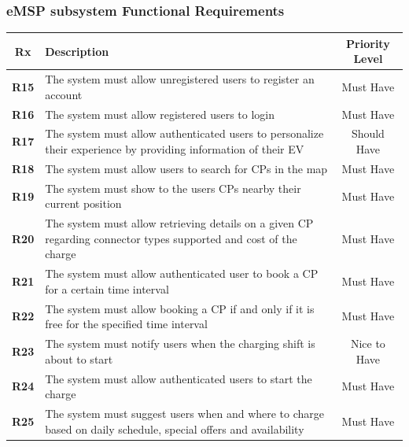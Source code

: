 \subsubsection{eMSP subsystem Functional Requirements}
\begin{table}[H]
    \begin{tabularx}{\textwidth}{cXc}
        \textbf{Rx}  & Description                                                                                                       & Priority Level \\
        \toprule
        \textbf{R15} & The system must allow unregistered users to register an account                                                   & Must Have      \\
        \textbf{R16} & The system must allow registered users to login                                                                   & Must Have      \\
        \textbf{R17} & The system must allow authenticated users to personalize their experience by providing information of their EV    & Should Have    \\
        \textbf{R18} & The system must allow users to search for CPs in the map                                                          & Must Have      \\
        \textbf{R19} & The system must show to the users CPs nearby their current position                                               & Must Have      \\
        \textbf{R20} & The system must allow retrieving details on a given CP regarding connector types supported and cost of the charge & Must Have      \\
        \textbf{R21} & The system must allow authenticated user to book a CP for a certain time interval                                 & Must Have      \\
        \textbf{R22} & The system must allow booking a CP if and only if it is free for the specified time interval                      & Must Have      \\
        \textbf{R23} & The system must notify users when the charging shift is about to start                                            & Nice to Have   \\
        \textbf{R24} & The system must allow authenticated users to start the charge                                                     & Must Have      \\
        \textbf{R25} & The system must suggest users when and where to charge based on daily schedule, special offers and availability   & Must Have      \\

\end{tabularx}
\end{table}
